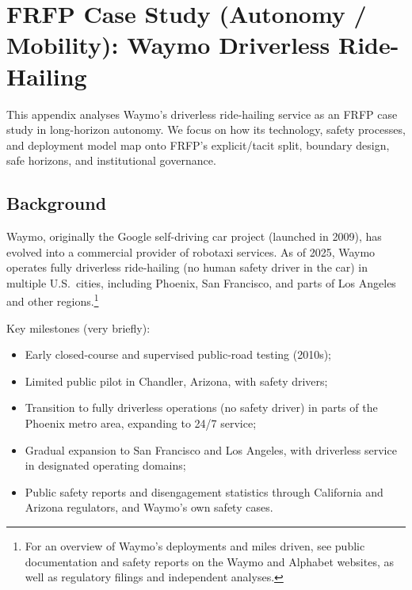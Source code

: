 
\section{FRFP Case Study (Autonomy / Mobility): Waymo Driverless Ride-Hailing}
\label{app:frfp-waymo}

This appendix analyses Waymo’s driverless ride-hailing service as an FRFP
case study in long-horizon autonomy.
We focus on how its technology, safety processes, and deployment model map
onto FRFP’s explicit/tacit split, boundary design, safe horizons, and
institutional governance.

\subsection{Background}

Waymo, originally the Google self-driving car project (launched in 2009),
has evolved into a commercial provider of robotaxi services.
As of 2025, Waymo operates fully driverless ride-hailing (no human safety
driver in the car) in multiple U.S.\ cities, including Phoenix, San
Francisco, and parts of Los Angeles and other regions.\footnote{For an
overview of Waymo’s deployments and miles driven, see public documentation
and safety reports on the Waymo and Alphabet websites, as well as regulatory
filings and independent analyses.}

Key milestones (very briefly):

\begin{itemize}
  \item Early closed-course and supervised public-road testing (2010s);
  \item Limited public pilot in Chandler, Arizona, with safety drivers;
  \item Transition to fully driverless operations (no safety driver) in
        parts of the Phoenix metro area, expanding to 24/7 service;
  \item Gradual expansion to San Francisco and Los Angeles, with
        driverless service in designated operating domains;
  \item Public safety reports and disengagement statistics through
        California and Arizona regulators, and Waymo’s own safety cases.
\end{itemize}

